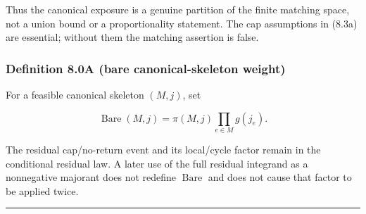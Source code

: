 \documentclass[11pt]{article}
\begin{document}
Thus the canonical exposure is a genuine partition of the finite matching space, not a union bound or a proportionality statement. The cap assumptions in (8.3a) are essential; without them the matching assertion is false.

\subsubsection{Definition 8.0A (bare canonical-skeleton weight)}\label{definition-8.0a-bare-canonical-skeleton-weight}

For a feasible canonical skeleton \((M,j)\), set

\[
 \operatorname{Bare}(M,j)=\pi(M,j)\prod_{e\in M}g(j_e).
 \tag{8.3f}
\]

The residual cap/no-return event and its local/cycle factor remain in the conditional residual law. A later use of the full residual integrand as a nonnegative majorant does not redefine \(\operatorname{Bare}\) and does not cause that factor to be applied twice.

\begin{center}\rule{0.5\linewidth}{0.5pt}\end{center}
\end{document}
